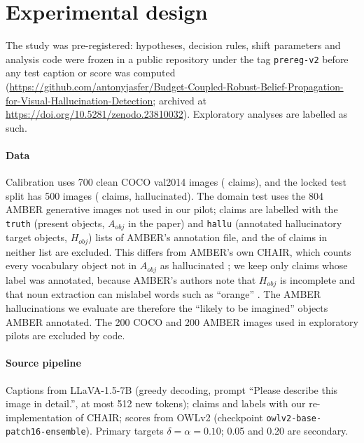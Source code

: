 \section{Experimental design}\label{sec:design}
The study was pre-registered: hypotheses, decision rules, shift parameters and analysis code were frozen in a public repository under the tag \texttt{prereg-v2} before any test caption or score was computed (\url{https://github.com/antonyjasfer/Budget-Coupled-Robust-Belief-Propagation-for-Visual-Hallucination-Detection}; archived at \url{https://doi.org/10.5281/zenodo.23810032}). Exploratory analyses are labelled as such.

\paragraph{Data} Calibration uses 700 clean COCO val2014 images \citep{lin2014microsoft} (\NCal{} claims), and the locked test split has 500 images (\NTest{} claims, \NTestHall{} hallucinated). The domain test uses the 804 AMBER generative images \citep{wang2023amber} not used in our pilot; claims are labelled with the \texttt{truth} (present objects, $A_{obj}$ in the paper) and \texttt{hallu} (annotated hallucinatory target objects, $H_{obj}$) lists of AMBER's annotation file, and the \NAmberUnknown{} of \NAmberClaims{} claims in neither list are excluded. This differs from AMBER's own CHAIR, which counts every vocabulary object not in $A_{obj}$ as hallucinated \citep[Eq.~2]{wang2023amber}; we keep only claims whose label was annotated, because AMBER's authors note that $H_{obj}$ is incomplete and that noun extraction can mislabel words such as ``orange'' \citep[Sec.~6]{wang2023amber}. The AMBER hallucinations we evaluate are therefore the ``likely to be imagined'' objects AMBER annotated. The 200 COCO and 200 AMBER images used in exploratory pilots are excluded by code.

\paragraph{Source pipeline} Captions from LLaVA-1.5-7B \citep{liu2024improved} (greedy decoding, prompt ``Please describe this image in detail.'', at most 512 new tokens); claims and labels with our re-implementation of CHAIR; scores from OWLv2 \citep{minderer2023scaling} (checkpoint \texttt{owlv2-base-}\allowbreak\texttt{patch16-ensemble}). Primary targets $\delta=\alpha=0.10$; 0.05 and 0.20 are secondary.

